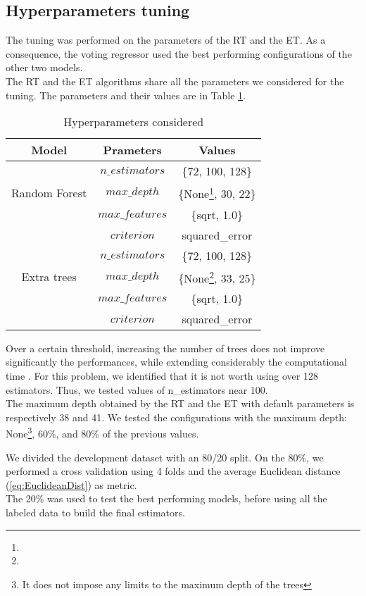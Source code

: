 \documentclass[conference]{IEEEtran}
\begin{document}
\subsection{Hyperparameters tuning}
The tuning was performed on the parameters of the RT and the ET. As a consequence, the voting regressor used the best performing configurations of the other two models. \\
The RT and the ET algorithms share all the parameters we considered for the tuning. The parameters and their values are in Table \ref{tab:tabHP}.
\begin{table}[h]
    \centering
    \caption{Hyperparameters considered}
    \label{tab:tabHP}
    \begin{tabular}{|c|c|c|}
        \hline
        \textbf{Model} & \textbf{Prameters} & \textbf{Values} \\
        \hline
        &$n\_estimators$&\{72, 100, 128\}\\
        Random Forest&$max\_depth$&\{None\footnote[1]{}, 30, 22\}\\
        &$max\_features$&\{sqrt, 1.0\}\\
        &$criterion$&squared\_error\\
        \hline
        &$n\_estimators$& \{72, 100, 128\} \\
        Extra trees&$max\_depth$&\{None\footnote[1]{}, 33, 25\}\\
        &$max\_features$&\{sqrt, 1.0\}\\
        &$criterion$&squared\_error\\
        \hline
    \end{tabular}
\end{table}

Over a certain threshold, increasing the number of trees does not improve significantly the performances, while extending considerably the computational time \cite{limitNumTrees}. For this problem, we identified that it is not worth using over 128 estimators. Thus, we tested values of n\_estimators near 100. \\

The maximum depth obtained by the RT and the ET with default parameters is respectively 38 and 41. We tested the configurations with the maximum depth: None\footnote[1]{It does not impose any limits to the maximum depth of the trees}, 60\%, and 80\% of the previous values. 

We divided the development dataset with an 80/20 split. On the 80\%, we performed a cross validation using 4 folds and the average Euclidean distance (\ref{eq:EuclideanDist}) as metric.\\
The 20\% was used to test the best performing models, before using all the labeled data to build the final estimators.
\end{document}
